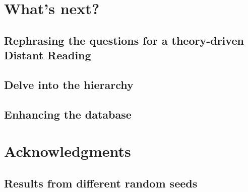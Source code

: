 \documentclass[a4paper, headings=standardclasses]{scrartcl}
\begin{document}
\section{What's next?}
\subsection{Rephrasing the questions for a theory-driven Distant Reading}

\subsection{Delve into the hierarchy}

\subsection{Enhancing the database}

\section*{Acknowledgments}

\clearpage
\begin{refcontext}[sorting=nyt]
  \printbibliography
\end{refcontext}
\clearpage

\begin{appendices}
  \section{Results from different random seeds}

\end{appendices}
\end{document}
